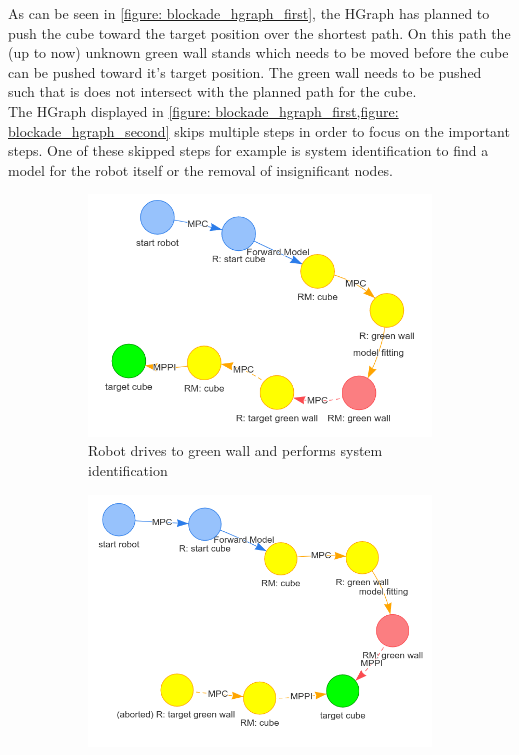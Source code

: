 As can be seen in \cref{figure: blockade_hgraph_first}, the HGraph has planned to push the cube toward the target position over the shortest path. On this path the (up to now) unknown green wall stands which needs to be moved before the cube can be pushed toward it's target position. The green wall needs to be pushed such that is does not intersect with the planned path for the cube. \\

The HGraph displayed in \cref{figure: blockade_hgraph_first,figure: blockade_hgraph_second} skips multiple steps in order to focus on the important steps. One of these skipped steps for example is system identification to find a model for the robot itself or the removal of insignificant nodes. 

\begin{figure}[H]
     \centering
     \begin{subfigure}[b]{0.49\textwidth}
         \centering
         \includegraphics[width=1\textwidth]{figures/blockade/5.png}
         \caption{Robot drives to green wall and performs system identification}
     \end{subfigure}
     \hfill
     \begin{subfigure}[b]{0.49\textwidth}
         \centering
         \includegraphics[width=\textwidth]{figures/blockade/6.png}

\end{subfigure}
\end{figure}
